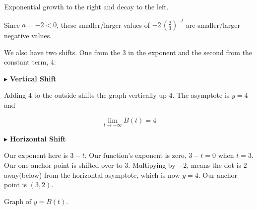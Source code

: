\documentclass{ximera}
\begin{document}
\begin{example}
\begin{idea}
Exponential growth to the right and decay to the left.






Since $a = -2 < 0$, these smaller/larger values of $-2 \, \left( \frac{2}{3} \right)^{-t}$ are smaller/larger negative values.



We also have two shifts. One from the $3$ in the exponent and the second from the constant term, $4$:




$\blacktriangleright$ \textbf{Vertical Shift}


Adding $4$ to the outside shifts the graph vertically up $4$.  The asymptote is $y = 4$ and 

\[ \lim\limits_{t \to -\infty} B(t) = 4 \]



$\blacktriangleright$ \textbf{Horizontal Shift}

Our exponent here is $3 - t$.  Our function's exponent is zero, $3-t=0$ when $t=3$. Our one anchor point is shifted over to $3$.  Multipying by $-2$, means the dot is $2$ away(below) from the horizontal asymptote, which is now $y=4$.  Our anchor point is $(3, 2)$.








Graph of $y = B(t)$.

\begin{image}
\end{image}
\end{idea}
\end{example}
\end{document}
